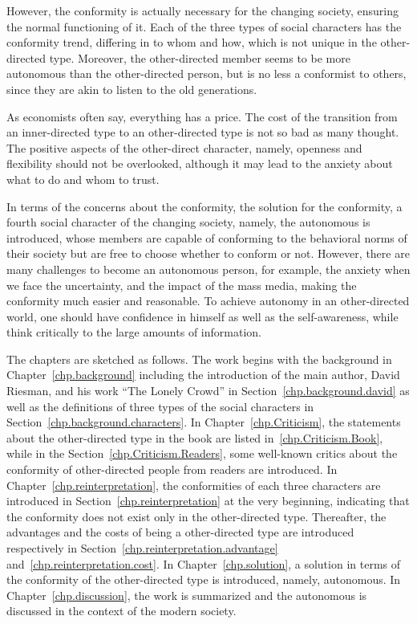 
However, the conformity is actually necessary for the changing society, ensuring the normal functioning of it. Each of the three types of social characters has the conformity trend, differing in to whom and how, which is not unique in the other-directed type. Moreover, the other-directed member seems to be more autonomous than the other-directed person, but is no less a conformist to others, since they are akin to listen to the old generations.

As economists often say, everything has a price. The cost of the transition from an inner-directed type to an other-directed type is not so bad as many thought. The positive aspects of the other-direct character, namely, openness and flexibility should not be overlooked, although it may lead to the anxiety about what to do and whom to trust.

In terms of the concerns about the conformity, the solution for the conformity, a fourth social character of the changing society, namely, the autonomous is introduced, whose members are capable of conforming to the behavioral norms of their society but are free to choose whether to conform or not. However, there are many challenges to become an autonomous person, for example, the anxiety when we face the uncertainty, and the impact of the mass media, making the conformity much easier and reasonable. To achieve autonomy in an other-directed world, one should have confidence in himself as well as the self-awareness, while think critically to the large amounts of information.
 
The chapters are sketched as follows. The work begins with the background in Chapter~\ref{chp.background} including the introduction of the main author, David Riesman, and his work ``The Lonely Crowd'' in Section~\ref{chp.background.david} as well as the definitions of three types of the social characters in Section~\ref{chp.background.characters}. In Chapter~\ref{chp.Criticism}, the statements about the other-directed type in the book are listed in~\ref{chp.Criticism.Book}, while in the Section~\ref{chp.Criticism.Readers}, some well-known critics about the conformity of other-directed people from readers are introduced. In Chapter~\ref{chp.reinterpretation}, the conformities of each three characters are introduced in Section~\ref{chp.reinterpretation} at the very beginning, indicating that the conformity does not exist only in the other-directed type. Thereafter, the advantages and the costs of being a other-directed type are introduced respectively in Section~\ref{chp.reinterpretation.advantage} and~\ref{chp.reinterpretation.cost}. In Chapter~\ref{chp.solution}, a solution in terms of the conformity of the other-directed type is introduced, namely, autonomous. In Chapter~\ref{chp.discussion}, the work is summarized and the autonomous is discussed in the context of the modern society.
